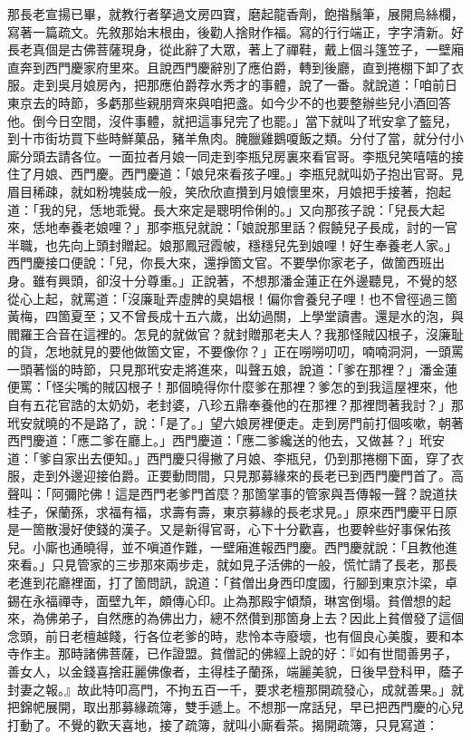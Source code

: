 \begin{showcontents}{}
那長老宣揚已畢，就教行者拏過文房四寶，磨起龍香劑，飽揝鬚筆，展開烏絲欄，寫著一篇疏文。先敘那始末根由，後勸人捨財作福。寫的行行端正，字字清新。好長老真個是古佛菩薩現身，從此辭了大眾，著上了禪鞋，戴上個斗篷笠子，一壁廂直奔到西門慶家府里來。且說西門慶辭別了應伯爵，轉到後廳，直到捲棚下卸了衣服。走到吳月娘房內，把那應伯爵荐水秀才的事體，說了一番。就說道：「咱前日東京去的時節，多虧那些親朋齊來與咱把盞。如今少不的也要整辦些兒小酒回答他。倒今日空間，沒件事體，就把這事兒完了也罷。」當下就叫了玳安拿了籃兒，到十市街坊買下些時鮮菓品，豬羊魚肉。腌臘雞鵝嗄飯之類。分付了當，就分付小廝分頭去請各位。一面拉者月娘一同走到李瓶兒房裏來看官哥。李瓶兒笑嘻嘻的接住了月娘、西門慶。西門慶道：「娘兒來看孩子哩。」李瓶兒就叫奶子抱出官哥。見眉目稀疎，就如粉塊裝成一般，笑欣欣直攢到月娘懷里來，月娘把手接著，抱起道：「我的兒，恁地乖覺。長大來定是聰明伶俐的。」又向那孩子說：「兒長大起來，恁地奉養老娘哩？」那李瓶兒就說：「娘說那里話？假饒兒子長成，討的一官半職，也先向上頭封贈起。娘那鳳冠霞帔，穩穩兒先到娘哩！好生奉養老人家。」西門慶接口便說：「兒，你長大來，還掙箇文官。不要學你家老子，做箇西班出身。雖有興頭，卻沒十分尊重。」正說著，不想那潘金蓮正在外邊聽見，不覺的怒從心上起，就罵道：「沒廉耻弄虛脾的臭娼根！偏你會養兒子哩！也不曾徑過三箇黃梅，四箇夏至；又不曾長成十五六歲，出幼過關，上學堂讀書。還是水的泡，與閻羅王合音在這裡的。怎見的就做官？就封贈那老夫人？我那怪賊囚根子，沒廉耻的貨，怎地就見的要他做箇文宦，不要像你？」正在嘮嘮叨叨，喃喃洞洞，一頭罵一頭著惱的時節，只見那玳安走將進來，叫聲五娘，說道：「爹在那裡？」潘金蓮便罵：「怪尖嘴的賊囚根子！那個曉得你什麼爹在那裡？爹怎的到我這屋裡來，他自有五花官誥的太奶奶，老封婆，八珍五鼎奉養他的在那裡？那裡問著我討？」那玳安就曉的不是路了，說：「是了。」望六娘房裡便走。走到房門前打個咳嗽，朝著西門慶道：「應二爹在廳上。」西門慶道：「應二爹纔送的他去，又做甚？」玳安道：「爹自家出去便知。」西門慶只得撇了月娘、李瓶兒，仍到那捲棚下面，穿了衣服，走到外邊迎接伯爵。正要動問間，只見那募緣來的長老已到西門慶門首了。高聲叫：「阿彌陀佛！這是西門老爹門首麼？那箇掌事的管家與吾傳報一聲？說道扶桂子，保蘭孫，求福有福，求壽有壽，東京募緣的長老求見。」原來西門慶平日原是一箇散漫好使錢的漢子。又是新得官哥，心下十分歡喜，也要幹些好事保佑孩兒。小廝也通曉得，並不嗔道作難，一壁廂進報西門慶。西門慶就說：「且教他進來看。」只見管家的三步那來兩步走，就如見子活佛的一般，慌忙請了長老，那長老進到花廳裡面，打了箇問訊，說道：「貧僧出身西印度國，行腳到東京汴梁，卓錫在永福禪寺，面壁九年，頗傳心印。止為那殿宇傾頹，琳宮倒塌。貧僧想的起來，為佛弟子，自然應的為佛出力，總不然儹到那箇身上去？因此上貧僧發了這個念頭，前日老檀越餞，行各位老爹的時，悲怜本寺廢壞，也有個良心美腹，要和本寺作主。那時諸佛菩薩，已作證盟。貧僧記的佛經上說的好：『如有世間善男子，善女人，以金錢喜捨莊麗佛像者，主得桂子蘭孫，端麗美貌，日後早登科甲，蔭子封妻之報。』故此特叩高門，不拘五百一千，要求老檀那開疏發心，成就善果。」就把錦帊展開，取出那募緣疏簿，雙手遞上。不想那一席話兒，早已把西門慶的心兒打動了。不覺的歡天喜地，接了疏簿，就叫小廝看茶。揭開疏簿，只見寫道：


\end{showcontents}
